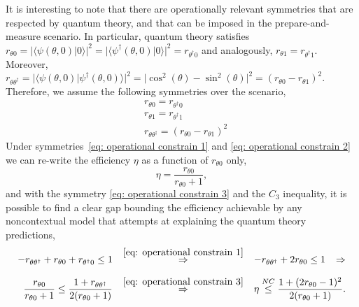 \documentclass[a4paper,twocolumn,11pt,accepted=2024-01-17]{quantumarticle}
\begin{document}
It is interesting to note that there are operationally relevant symmetries that are respected by quantum theory, and that can be imposed in the prepare-and-measure scenario. In particular, quantum theory satisfies $r_{\theta 0} = \vert \langle \psi(\theta,0) \vert 0\rangle \vert^2 = \vert \langle \psi^\dagger(\theta,0) \vert 0 \rangle \vert^2 = r_{\theta^\dagger 0}$ and analogously,  $r_{\theta 1} = r_{\theta^\dagger 1}$. Moreover, $r_{\theta \theta^\dagger} = \vert \langle \psi(\theta,0)\vert \psi^\dagger(\theta,0) \rangle  \vert^2 = \vert\cos^2(\theta)-\sin^2(\theta)\vert^2= (r_{\theta 0} - r_{\theta 1})^2$. Therefore, we assume the following symmetries over the scenario, 
\begin{align}
    &r_{\theta 0} = r_{\theta^\dagger 0}\label{eq: operational constrain 1}\\
    &r_{\theta 1} = r_{\theta^\dagger 1}\label{eq: operational constrain 2}\\
    &r_{\theta \theta^\dagger} = (r_{\theta 0} - r_{\theta 1})^2\label{eq: operational constrain 3}
\end{align}
Under symmetries~\eqref{eq: operational constrain 1} and \eqref{eq: operational constrain 2} we can re-write the efficiency $\eta$ as a function of $r_{\theta 0}$ only,
\begin{equation}\label{eq: operational efficiency with constraints}
    \eta = \frac{r_{\theta 0}}{r_{\theta 0}+1},
\end{equation}
and with the symmetry \eqref{eq: operational constrain 3} and the $C_3$ inequality, it is possible to find a clear gap bounding the efficiency achievable by any noncontextual model that attempts at explaining the quantum theory predictions,
\begin{align*}
    -r_{\theta \theta^\dagger}+r_{\theta 0} + r_{\theta^\dagger 0} \leq 1 \hspace{0.8em}&\stackrel{\eqref{eq: operational constrain 1}}{\Rightarrow}\hspace{0.8em}
    -r_{\theta \theta^\dagger} + 2r_{\theta 0} \leq 1 \hspace{0.8em}\Rightarrow \\[1.5ex]
    \frac{r_{\theta 0}}{r_{\theta 0} + 1} \leq \frac{1 + r_{\theta \theta^\dagger}}{2(r_{\theta 0}+1)} \hspace{0.8em}&\stackrel{\eqref{eq: operational constrain 3}}{\Rightarrow}\hspace{0.8em} \eta \stackrel{\small{NC}}{\leq} \frac{1 + (2r_{\theta 0}-1)^2}{2(r_{\theta 0}+1)}.
\end{align*}
\end{document}
